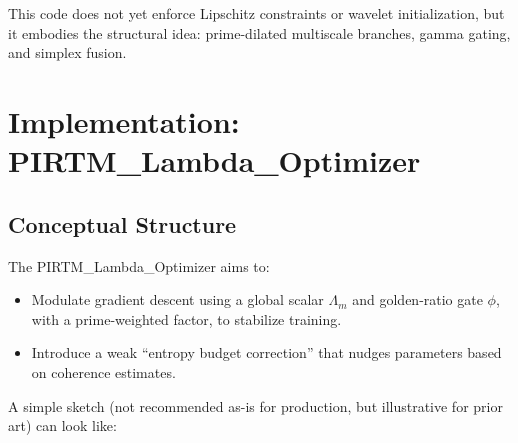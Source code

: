 \documentclass[11pt]{article}
\begin{document}
This code does not yet enforce Lipschitz constraints or wavelet initialization, but it embodies the structural idea: prime-dilated multiscale branches, gamma gating, and simplex fusion.

\section{Implementation: PIRTM\_Lambda\_Optimizer}

\subsection{Conceptual Structure}

The PIRTM\_Lambda\_Optimizer aims to:

\begin{itemize}
  \item Modulate gradient descent using a global scalar $\Lambda_m$ and golden-ratio gate $\phi$, with a prime-weighted factor, to stabilize training.
  \item Introduce a weak ``entropy budget correction'' that nudges parameters based on coherence estimates.
\end{itemize}

A simple sketch (not recommended as-is for production, but illustrative for prior art) can look like:
\end{document}
